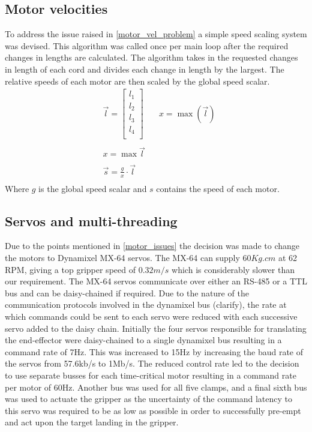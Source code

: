 \documentclass[conference]{IEEEtran}
\begin{document}
\subsection{Motor velocities}\label{motor_speed_section}
To address the issue raised in \ref{motor_vel_problem} a simple speed scaling system was devised. This algorithm was called once per main loop after the required changes in lengths are calculated. The algorithm takes in the requested changes in length of each cord and divides each change in length by the largest. The relative speeds of each motor are then scaled by the global speed scalar.
\begin{equation}\label{motor_speed_equation}
\begin{aligned}
&\vec{l} = \begin{bmatrix}
l_1\\l_2\\l_3\\l_4\\
\end{bmatrix}\quad
&x = \max\left(\vec{l}\right)\\\\
&x = \max\vec{l}\\\\
&\vec{s} = \frac{g}{x}\cdot \vec{l}\\
\end{aligned}
\end{equation}
Where $g$ is the global speed scalar and $s$ contains the speed of each motor. 
\subsection{Servos and multi-threading}
Due to the points mentioned in \ref{motor_issues} the decision was made to change the motors to Dynamixel MX-64 servos. The MX-64 can supply $60Kg.cm$ at 62 RPM, giving a top gripper speed of $0.32m/s$ which is considerably slower than our requirement. The MX-64 servos communicate over either an RS-485 or a TTL bus and can be daisy-chained if required. Due to the nature of the communication protocols involved in the dynamixel bus (clarify), the rate at which commands could be sent to each servo were reduced with each successive servo added to the daisy chain. Initially the four servos responsible for translating the end-effector were daisy-chained to a single dynamixel bus resulting in a command rate of 7Hz. This was increased to 15Hz by increasing the baud rate of the servos from 57.6kb/s to 1Mb/s. The reduced control rate led to the decision to use separate busses for each time-critical motor resulting in a command rate per motor of 60Hz. Another bus was used for all five clamps, and a final sixth bus was used to actuate the gripper as the uncertainty of the command latency to this servo was required to be as low as possible in order to successfully pre-empt and act upon the target landing in the gripper. 
\end{document}
